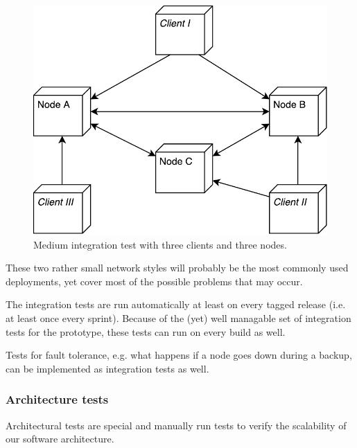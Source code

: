 \begin{figure}
	\centering
	\includegraphics[width=0.5\linewidth]{resources/integration_test_medium}
	\caption[Medium integration test]{Medium integration test with three \glspl{client} and three \glspl{node}.}
	\label{fig:integrationtestmedium}
\end{figure}

These two rather small network styles will probably be the most commonly used deployments, yet cover most of the possible problems that may occur.

The integration tests are run automatically at least on every tagged release (i.e. at least once every sprint). Because of the (yet) well managable set of integration tests for the prototype, these tests can run on every build as well.

Tests for fault tolerance, e.g. what happens if a \gls{node} goes down during a backup, can be implemented as integration tests as well.

\subsubsection{Architecture tests}

Architectural tests are special and manually run tests to verify the scalability of our software architecture.